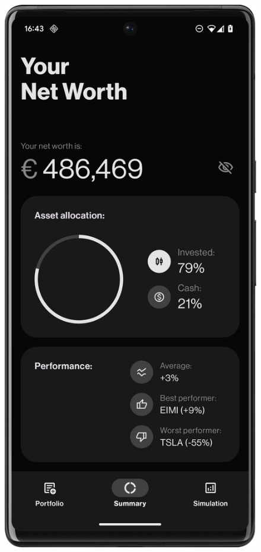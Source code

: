 \begin{figure}[H]
\begin{minipage}{0.24\textwidth}
        \label{fig:product_card}
    \end{minipage}
    \hfill
    \begin{minipage}{0.24\textwidth}
        \centering
        \includegraphics[width=\textwidth]{foto/summary_screen}
        \label{fig:summary_screen}
    \end{minipage}
\end{figure}

